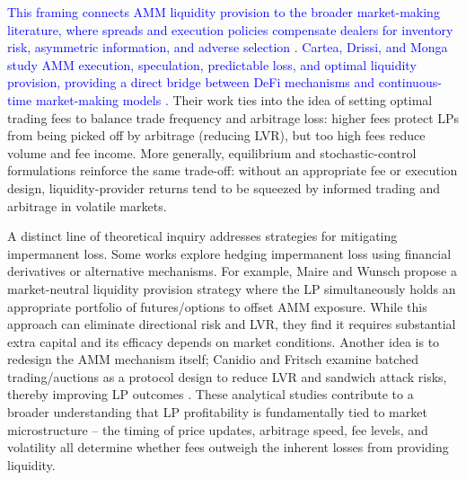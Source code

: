 \documentclass[11pt]{article}
\begin{document}
\textcolor{blue}{This framing connects AMM liquidity provision to the broader market-making literature, where spreads and execution policies compensate dealers for inventory risk, asymmetric information, and adverse selection \cite{ho1983,avellaneda2008,cartea2015book,gueant2016book}.} \textcolor{blue}{Cartea, Drissi, and Monga study AMM execution, speculation, predictable loss, and optimal liquidity provision, providing a direct bridge between DeFi mechanisms and continuous-time market-making models \cite{cartea2022execution,cartea2023}.} Their work ties into the idea of setting optimal trading fees to balance trade frequency and arbitrage loss: higher fees protect LPs from being picked off by arbitrage (reducing LVR), but too high fees reduce volume and fee income. More generally, equilibrium and stochastic-control formulations reinforce the same trade-off: without an appropriate fee or execution design, liquidity-provider returns tend to be squeezed by informed trading and arbitrage in volatile markets.

A distinct line of theoretical inquiry addresses strategies for mitigating impermanent loss. Some works explore hedging impermanent loss using financial derivatives or alternative mechanisms. For example, Maire and Wunsch \cite{maire2024} propose a market-neutral liquidity provision strategy where the LP simultaneously holds an appropriate portfolio of futures/options to offset AMM exposure. While this approach can eliminate directional risk and LVR, they find it requires substantial extra capital and its efficacy depends on market conditions. Another idea is to redesign the AMM mechanism itself; Canidio and Fritsch examine batched trading/auctions as a protocol design to reduce LVR and sandwich attack risks, thereby improving LP outcomes \cite{canidio2025}. These analytical studies contribute to a broader understanding that LP profitability is fundamentally tied to market microstructure – the timing of price updates, arbitrage speed, fee levels, and volatility all determine whether fees outweigh the inherent losses from providing liquidity.
\end{document}
